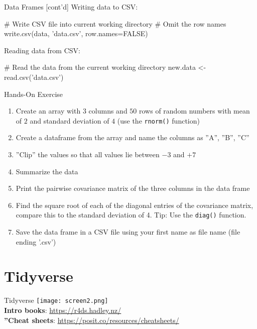 \documentclass[ignorenonframetext,xcolor=x11names]{beamer}
\begin{document}
\begin{frame}[fragile]{Data Frames \small [cont'd]}
Writing data to CSV:
\begin{Rcode}
# Write CSV file into current working directory
# Omit the row names
write.csv(data, 'data.csv', row.names=FALSE)
\end{Rcode}

Reading data from CSV:
\begin{Rcode}
# Read the data from the current working directory
new.data <- read.csv('data.csv')
\end{Rcode}
\end{frame}

\begin{frame}{Hands-On Exercise}
\begin{enumerate}
   \item Create an array with $3$ columns and $50$ rows of random numbers with mean of $2$ and standard deviation of $4$ (use the \texttt{rnorm()} function)
   \item Create a dataframe from the array and name the columns as ''A'', ''B'', ''C''
   \item ''Clip'' the values so that all values lie between $-3$ and $+7$
   \item Summarize the data 
   \item Print the pairwise covariance matrix of the three columns in the data frame
   \item Find the square root of each of the diagonal entries of the covariance matrix, compare this to the standard deviation of 4. Tip: Use the \texttt{diag()} function.
   \item Save the data frame in a CSV file using your first name as file name (file ending '.csv')
\end{enumerate}
\end{frame}

\section{Tidyverse}

\begin{frame}{Tidyverse}
\texttt{[image: screen2.png]}\\

\textbf{Intro books}: \url{https://r4ds.hadley.nz/} \\

\textbf{''Cheat sheets}: \url{https://posit.co/resources/cheatsheets/} 
\end{frame}
\end{document}

